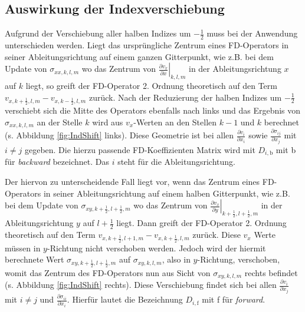 \documentclass[pdftex,a4paper,parskip,listof=totoc,bibliography=totoc,onehalfspacing,12pt]{scrreprt}
\begin{document}
\subsection{Auswirkung der Indexverschiebung}
Aufgrund der Verschiebung aller halben Indizes um $-\frac{1}{2}$ muss bei der Anwendung unterschieden werden. Liegt das ursprüngliche Zentrum eines FD-Operators in seiner Ableitungsrichtung auf einem ganzen Gitterpunkt, wie z.B. bei dem Update von $\sigma_{xx,k,l,m}$ wo das Zentrum von $\left. \frac{\partial v_x}{\partial x} \right\rvert_{k,l,m}$ in der Ableitungsrichtung $x$ auf $k$ liegt, so greift der FD-Operator 2. Ordnung theoretisch auf den Term $v_{x,k+\frac{1}{2},l,m} - v_{x,k-\frac{1}{2},l,m}$ zurück. Nach der Reduzierung der halben Indizes um $-\frac{1}{2}$ verschiebt sich die Mitte des Operators ebenfalls nach links und das Ergebnis von $\sigma_{xx,k,l,m}$ an der Stelle $k$ wird aus $v_x$-Werten an den Stellen $k-1$ und $k$ berechnet (s. Abbildung \ref{fig:IndShift} links). Diese Geometrie ist bei allen $\frac{\partial v_i}{\partial x_i}$ sowie $\frac{\partial \sigma_{ij}}{\partial x_j}$ mit $i\neq j$ gegeben. Die hierzu passende FD-Koeffizienten Matrix wird mit $D_{i,\mathrm{b}}$ mit b für \textit{backward} bezeichnet. Das $i$ steht für die Ableitungsrichtung.

Der hiervon zu unterscheidende Fall liegt vor, wenn das Zentrum eines FD-Operators in seiner Ableitungsrichtung auf einem halben Gitterpunkt, wie z.B. bei dem Update von $\sigma_{xy,k+\frac{1}{2},l+\frac{1}{2},m}$ wo das Zentrum von $\left. \frac{\partial v_x}{\partial y} \right\rvert_{k+\frac{1}{2},l+\frac{1}{2},m}$ in der Ableitungsrichtung $y$ auf $l+\frac{1}{2}$ liegt. Dann greift der FD-Operator 2. Ordnung theoretisch auf den Term $v_{x,k+\frac{1}{2},l+1,m} - v_{x,k+\frac{1}{2},l,m}$ zurück. Diese $v_x$ Werte müssen in $y$-Richtung nicht verschoben werden. Jedoch wird der hiermit berechnete Wert $\sigma_{xy,k+\frac{1}{2},l+\frac{1}{2},m}$ auf $\sigma_{xy,k,l,m}$, also in $y$-Richtung, verschoben, womit das Zentrum des FD-Operators nun aus Sicht von $\sigma_{xy,k,l,m}$ rechts befindet (s. Abbildung \ref{fig:IndShift} rechts). Diese Verschiebung findet sich bei allen $\frac{\partial v_i}{\partial x_j}$ mit $i\neq j$ und $\frac{\partial \sigma_{ii}}{\partial x_i}$. Hierfür lautet die Bezeichnung $D_{i,\mathrm{f}}$ mit f für \textit{forward}.
\end{document}
